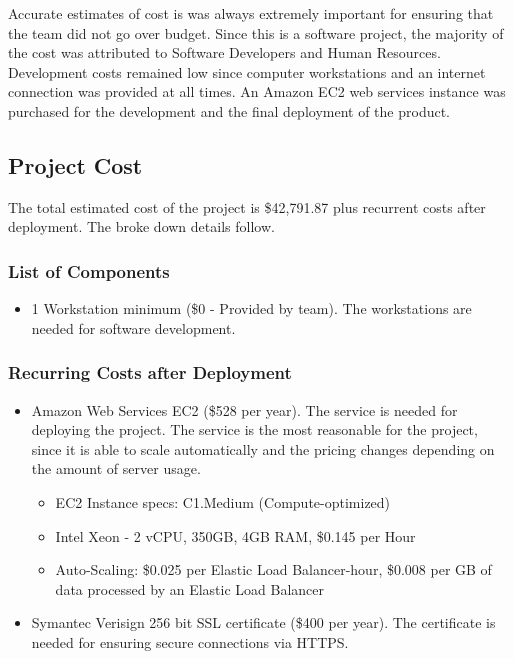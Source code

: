 \label{sec:Budget}

Accurate estimates of cost is was always extremely important for ensuring that the team
did not go over budget. Since this is a software project, the majority of the
cost was attributed to Software Developers and Human Resources. Development costs
remained low since computer workstations and an internet connection was
provided at all times. An Amazon EC2 web services instance was purchased for the development and the final deployment of the product.

\subsection{Project Cost}
The total estimated cost of the project is \$42,791.87 plus recurrent costs
after deployment. The broke down details follow.

\subsubsection{List of Components}
\begin{itemize}
\item 1 Workstation minimum (\$0 - Provided by team). The workstations are
needed for software development.
\end{itemize}

\subsubsection{Recurring Costs after Deployment}
\begin{itemize}
\item Amazon Web Services EC2 (\$528 per year). The service is needed for
deploying the project. The service is the most reasonable for the project, since
it is able to scale automatically and the pricing changes depending on the
amount of server usage.
\begin{itemize}
\item EC2 Instance specs: C1.Medium (Compute-optimized)
\item Intel Xeon - 2 vCPU, 350GB, 4GB RAM, \$0.145 per Hour
\item Auto-Scaling: \$0.025 per Elastic Load Balancer-hour, \$0.008 per GB of data processed by an Elastic Load Balancer
\end{itemize}


\item Symantec Verisign 256 bit SSL certificate (\$400 per year). The
certificate is needed for ensuring secure connections via HTTPS.
\end{itemize}

